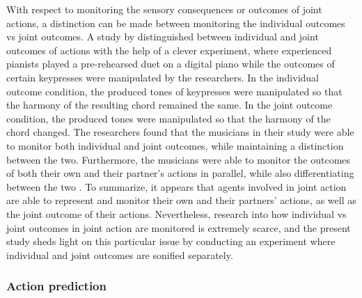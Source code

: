 \documentclass[10pt,a4paper,onecolumn]{article}
\begin{document}
With respect to monitoring the sensory consequences or outcomes of joint actions, a distinction can be made between monitoring the individual outcomes vs joint outcomes. A study by \textcite{loehrMonitoringIndividualJoint2013} distinguished between individual and joint outcomes of actions with the help of a clever experiment, where experienced pianists played a pre-rehearsed duet on a digital piano while the outcomes of certain keypresses were manipulated by the researchers. In the individual outcome condition, the produced tones of keypresses were manipulated so that the harmony of the resulting chord remained the same. In the joint outcome condition, the produced tones were manipulated so that the harmony of the chord changed. The researchers found that the musicians in their study were able to monitor both individual and joint outcomes, while maintaining a distinction between the two. Furthermore, the musicians were able to monitor the outcomes of both their own and their partner's actions in parallel, while also differentiating between the two \autocite{loehrMonitoringIndividualJoint2013}. To summarize, it appears that agents involved in joint action are able to represent and monitor their own and their partners' actions, as well as the joint outcome of their actions. Nevertheless, research into how individual vs joint outcomes in joint action are monitored is extremely scarce, and the present study sheds light on this particular issue by conducting an experiment where individual and joint outcomes are sonified separately.

\hypertarget{action-prediction}{%
\subsubsection{Action prediction}\label{action-prediction}}
\end{document}
